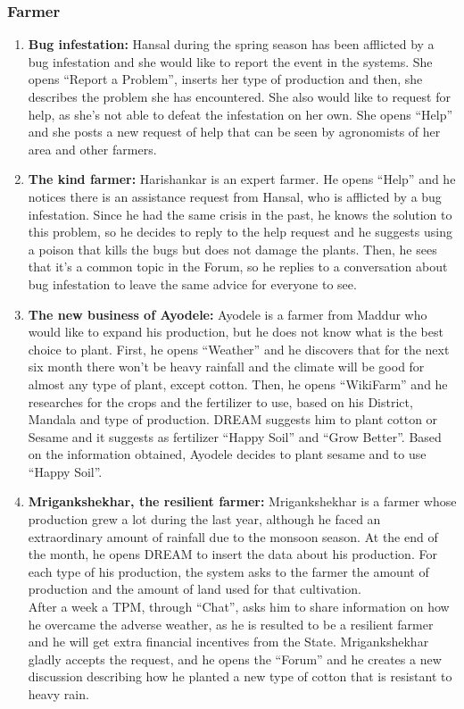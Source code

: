 \subsubsection{Farmer}
\begin{enumerate} [label=\textbf{F.\arabic*}]
    \item \textbf{Bug infestation:} Hansal during the spring season has been afflicted by a bug infestation and she would like to report the event in the systems. She opens “Report a Problem”, inserts her type of production and then, she describes the problem she has encountered. She also would like to request for help, as she’s not able to defeat the infestation on her own. She opens “Help” and she posts a new request of help that can be seen by agronomists of her area and other farmers.
    \item \textbf{The kind farmer: }Harishankar is an expert farmer. He opens “Help” and he notices there is an assistance request from Hansal, who is afflicted by a bug infestation. Since he had the same crisis in the past, he knows the solution to this problem, so he decides to reply to the help request and he suggests using a poison that kills the bugs but does not damage the plants. Then, he sees that it’s a common topic in the Forum, so he replies to a conversation about bug infestation to leave the same advice for everyone to see.
    \item \textbf{The new business of Ayodele: } Ayodele is a farmer from Maddur who would like to expand his production, but he does not know what is the best choice to plant. First, he opens “Weather” and he discovers that for the next six month there won’t be heavy rainfall and the climate will be good for almost any type of plant, except cotton. Then, he opens “WikiFarm” and he researches for the crops and the fertilizer to use, based on his District, Mandala and type of production. DREAM suggests him to plant cotton or Sesame and it suggests as fertilizer “Happy Soil” and “Grow Better”. Based on the information obtained, Ayodele decides to plant sesame and to use “Happy Soil”.
    \item \textbf{Mrigankshekhar, the resilient farmer: } Mrigankshekhar is a farmer whose production grew a lot during the last year, although he faced an extraordinary amount of rainfall due to the monsoon season. At the end of the month, he opens DREAM to insert the data about his production. For each type of his production, the system asks to the farmer the amount of production and the amount of land used for that cultivation. \\After a week a TPM, through “Chat”, asks him to share information on how he overcame the adverse weather, as he is resulted to be a resilient farmer and he will get extra financial incentives from the State. Mrigankshekhar gladly accepts the request, and he opens the “Forum” and he creates a new discussion describing how he planted a new type of cotton that is resistant to heavy rain.
\end{enumerate}
